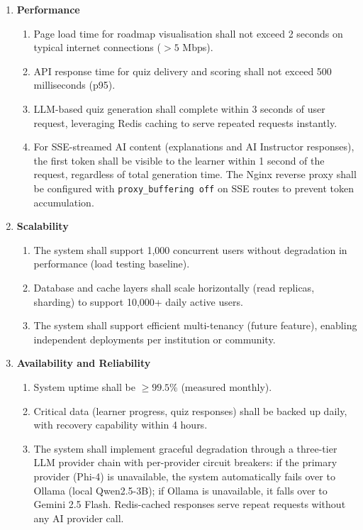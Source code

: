 \begin{enumerate}
    \item[\textbf{NFR1:}] \textbf{Performance}
        \begin{enumerate}
            \item[\textbf{NFR1.1:}] Page load time for roadmap visualisation shall not exceed 2 seconds on typical internet connections (\(>5\) Mbps).
            \item[\textbf{NFR1.2:}] API response time for quiz delivery and scoring shall not exceed 500 milliseconds (p95).
            \item[\textbf{NFR1.3:}] LLM-based quiz generation shall complete within 3 seconds of user request, leveraging Redis caching to serve repeated requests instantly.
            \item[\textbf{NFR1.4:}] For SSE-streamed AI content (explanations and AI Instructor responses), the first token shall be visible to the learner within 1 second of the request, regardless of total generation time. The Nginx reverse proxy shall be configured with \texttt{proxy\_buffering off} on SSE routes to prevent token accumulation.
        \end{enumerate}

    \item[\textbf{NFR2:}] \textbf{Scalability}
        \begin{enumerate}
            \item[\textbf{NFR2.1:}] The system shall support 1,000 concurrent users without degradation in performance (load testing baseline).
            \item[\textbf{NFR2.2:}] Database and cache layers shall scale horizontally (read replicas, sharding) to support 10,000+ daily active users.
            \item[\textbf{NFR2.3:}] The system shall support efficient multi-tenancy (future feature), enabling independent deployments per institution or community.
        \end{enumerate}

    \item[\textbf{NFR3:}] \textbf{Availability and Reliability}
        \begin{enumerate}
            \item[\textbf{NFR3.1:}] System uptime shall be \(\ge 99.5\%\) (measured monthly).
            \item[\textbf{NFR3.2:}] Critical data (learner progress, quiz responses) shall be backed up daily, with recovery capability within 4 hours.
            \item[\textbf{NFR3.3:}] The system shall implement graceful degradation through a three-tier LLM provider chain with per-provider circuit breakers: if the primary provider (Phi-4) is unavailable, the system automatically fails over to Ollama (local Qwen2.5-3B); if Ollama is unavailable, it falls over to Gemini 2.5 Flash. Redis-cached responses serve repeat requests without any AI provider call.
        \end{enumerate}


\end{enumerate}
